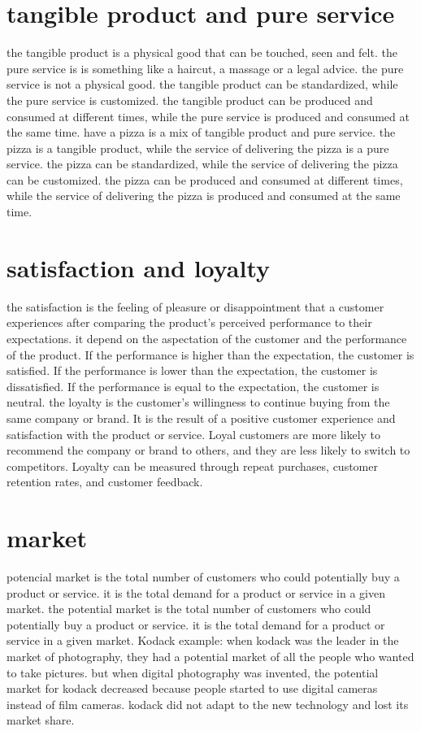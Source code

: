 \documentclass[12pt,a4paper]{report}
\begin{document}
\section{tangible product and pure service}
the tangible product is a physical good that can be touched, seen and felt. the pure service is is something like a haircut, a massage or a legal advice. the pure service is not a physical good.
the tangible product can be standardized, while the pure service is customized. the tangible product can be produced and consumed at different times, while the pure service is produced and consumed at the same time.
have a pizza is a mix of tangible product and pure service. the pizza is a tangible product, while the service of delivering the pizza is a pure service. the pizza can be standardized, while the service of delivering the pizza can be customized. the pizza can be produced and consumed at different times, while the service of delivering the pizza is produced and consumed at the same time.
\section{satisfaction and loyalty}
the satisfaction is the feeling of pleasure or disappointment that a customer experiences after comparing the product's perceived performance to their expectations.
it depend on the aspectation of the customer and the performance of the product. If the performance is higher than the expectation, the customer is satisfied. If the performance is lower than the expectation, the customer is dissatisfied. If the performance is equal to the expectation, the customer is neutral.
 the loyalty is the customer's willingness to continue buying from the same company or brand. It is the result of a positive customer experience and satisfaction with the product or service. Loyal customers are more likely to recommend the company or brand to others, and they are less likely to switch to competitors. Loyalty can be measured through repeat purchases, customer retention rates, and customer feedback.
\section{market }
potencial market is the total number of customers who could potentially buy a product or service. it is the total demand for a product or service in a given market. the potential market is the total number of customers who could potentially buy a product or service. it is the total demand for a product or service in a given market.
Kodack example: when kodack was the leader in the market of photography, they had a potential market of all the people who wanted to take pictures. but when digital photography was invented, the potential market for kodack decreased because people started to use digital cameras instead of film cameras. kodack did not adapt to the new technology and lost its market share.
\end{document}
